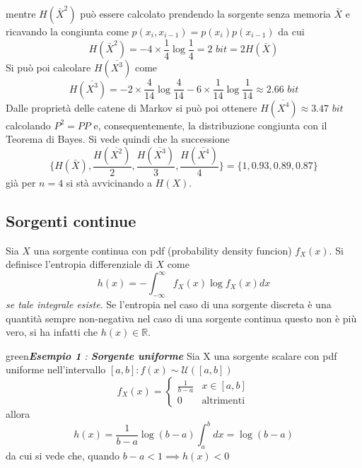 mentre $H(\bar{X}^2)$ pu\`o essere calcolato prendendo la sorgente senza memoria $\bar{X}$ e ricavando la congiunta come $p(x_i,x_{i-1})=p(x_i)p(x_{i-1})$ da cui
\begin{equation*}
    H(\bar{X}^2) = - 4 \times \frac{1}{4} \log \frac{1}{4} = 2 \hspace{4pt} bit = 2 H(\bar{X})
\end{equation*}
Si pu\`o poi calcolare $H(\overline{X^3})$ come
\begin{equation*}
    H(\overline{X^3}) = -2 \times \frac{4}{14} \log \frac{4}{14} - 6 \times \frac{1}{14} \log \frac{1}{14} \approx 2.66 \hspace{4pt} bit
\end{equation*}
Dalle propriet\`a delle catene di Markov si pu\`o poi ottenere $H(\overline{X^4}) \approx 3.47$ $bit$ calcolando $P^2 = PP$ e, consequentemente, la distribuzione congiunta con il Teorema di Bayes. Si vede quindi che la successione
\begin{equation*}
    \bigg \{H(\bar{X}), \frac{H(\overline{X^2})}{2}, \frac{H(\overline{X^3})}{3}, \frac{H(\overline{X^4})}{4} \bigg \} = \{ 1, 0.93, 0.89, 0.87 \}
\end{equation*}
gi\`a per $n=4$ si st\`a avvicinando a $H(X)$. 
\subsection{Sorgenti continue}
Sia $X$ una sorgente continua con pdf (probability density funcion) $f_X(x)$.
 Si definisce l'entropia differenziale di $X$ come
\begin{equation}
    h(x) = - \int_{-\infty}^\infty f_X(x) \log f_X(x) dx
\end{equation}
\textit{se tale integrale esiste}. Se l'entropia nel caso di una sorgente discreta \`e una quantit\`a sempre non-negativa nel caso di una sorgente continua questo non \`e pi\`u vero, si ha infatti che $h(x) \in \mathbb{R}$.

\begin{mybox}{green}{\textit{\textbf{Esempio 1} : \textbf{Sorgente uniforme }}}
Sia X una sorgente scalare con pdf uniforme nell'intervallo $[a,b]: f(x) \sim \mathcal{U}([a,b])$ 
\begin{equation*}
    f_X(x) = \begin{cases}
    \frac{1}{b-a} & x \in [a,b]\\
    0 & \text{altrimenti}
    \end{cases}
\end{equation*}
allora
\begin{equation*}
    h(x) = \frac{1}{b-a} \log(b-a) \int_{a}^b dx = \log(b-a)
\end{equation*}
da cui si vede che, quando $b-a < 1 \implies h(x)<0$
\end{mybox}

